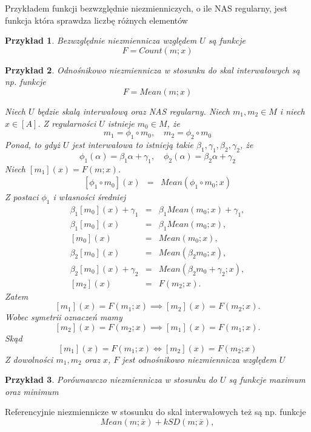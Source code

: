 \documentclass[12pt,a4paper]{report}
\newtheorem{przyklad}{Przykład}
\newcommand{\domkniecie}[1]{\left\lbrack{#1}\right\rbrack}
\begin{document}
Przykładem funkcji bezwzględnie niezmienniczych, o ile NAS regularny, jest funkcja która sprawdza liczbę różnych elementów
\begin{przyklad}
Bezwzględnie niezmiennicza względem $U$ są funkcje 
$$
F=Count(m;x)
$$
\end{przyklad}
\begin{przyklad}
Odnośnikowo niezmiennicza w stosunku do skal interwałowych są np. funkcje
$$
F=Mean(m;x)
$$ 

Niech $U$ będzie skalą interwałową oraz NAS regularny.
Niech $m_1,m_2\in M$ i niech $x\in \domkniecie{A}$. Z regularności $U$ istnieje $m_0 \in M$, że
$$
m_1 = \phi_1 \circ m_0, \quad m_2=\phi_2\circ m_0
$$
Ponad, to gdyż $U$ jest interwałowa to istnieją takie $\beta_{1}, \gamma_{1}, \beta_{2}, \gamma_{2}$, że
$$
\phi_1(\alpha)=\beta_1 \alpha + \gamma_1, \quad \phi_2(\alpha)=\beta_2 \alpha + \gamma_2
$$
Niech $\domkniecie{m_1}(x)=F(m;x)$.
\begin{eqnarray*}
\domkniecie{\phi_1\circ m_0}(x) & = & Mean(\phi_1\circ m_0;x) 
\end{eqnarray*}
Z postaci $\phi_{1}$ i własności średniej
\begin{eqnarray*}
\beta_1\domkniecie{m_0}(x)+ \gamma_1 & = & \beta_1 Mean(m_0;x) + \gamma_1, \\
\beta_1\domkniecie{m_0}(x) & = & \beta_1 Mean(m_0;x), \\
\domkniecie{m_0}(x) & = & Mean(m_0;x), \\
\beta_2\domkniecie{m_0}(x) & = & Mean(\beta_2 m_0;x), \\
\beta_2\domkniecie{m_0}(x) + \gamma_2 & = & Mean(\beta_2 m_0 + \gamma_2;x),  \\
\domkniecie{m_2}(x) & = & F(m_2;x) .
\end{eqnarray*}
Zatem
$$
\domkniecie{m_1}(x)=F(m_1;x) \implies \domkniecie{m_2}(x)=F(m_2;x).
$$
Wobec symetrii oznaczeń mamy
$$
\domkniecie{m_2}(x)=F(m_2;x) \implies \domkniecie{m_1}(x)=F(m_1;x).
$$
Skąd
$$
\domkniecie{m_1}(x)=F(m_1;x) \iff \domkniecie{m_2}(x)=F(m_2;x)
$$
Z dowolności $m_1,m_2$ oraz $x$, $F$ jest odnośnikowo niezmiennicza względem $U$
\end{przyklad}
\begin{przyklad}
Porównawczo niezmiennicza w stosunku do $U$ są funkcje maximum oraz minimum
\end{przyklad}
Referencyjnie niezmiennicze w stosunku do skal interwałowych też są np. funkcje
\begin{equation*}
Mean(m;\overline{x})+kSD(m;\overline{x}),
\end{equation*}
\end{document}
